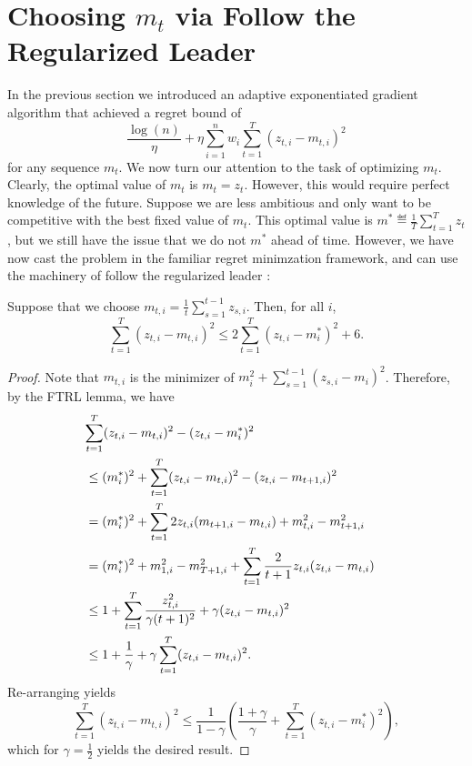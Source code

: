 \documentclass[paper_icml.tex]{subfiles}
\begin{document}
\section{Choosing $m_t$ via Follow the Regularized Leader} 
\label{sec:ftrl-aux}
In the previous section we introduced an adaptive exponentiated 
gradient algorithm that achieved a regret bound of 
\[ \frac{\log(n)}{\eta} + \eta \sum_{i=1}^n w_i \sum_{t=1}^T (z_{t,i} - m_{t,i})^2 \]
for any sequence $m_t$. We now turn our attention to the task of 
optimizing $m_t$. Clearly, the optimal value of $m_t$ is $m_t = z_t$. However, 
this would require perfect knowledge of the future. Suppose we are less ambitious 
and only want to be competitive with the best fixed value of $m_t$. This optimal value 
is $m^* \eqdef \frac{1}{T} \sum_{t=1}^T z_t$, but we still have the issue that 
we do not $m^*$ ahead of time. However, we have now cast the problem in the familiar 
regret minimzation framework, and can use the machinery of follow the regularized 
leader \cite{hazan2011ftrl}:
\begin{proposition}
\label{prop:ftrl-aux}
Suppose that we choose $m_{t,i} = \frac{1}{t} \sum_{s=1}^{t-1} z_{s,i}$. 
Then, for all $i$, 
\[ \sum_{t=1}^T (z_{t,i} - m_{t,i})^2 \leq 2\sum_{t=1}^T (z_{t,i} - m^*_i)^2 + 6. \]
\end{proposition}
\begin{proof}
Note that $m_{t,i}$ is the minimizer of $m_i^2 + \sum_{s=1}^{t-1} (z_{s,i} - m_i)^2$. 
Therefore, by the FTRL lemma, we have
\begin{align*}
\lefteqn{\sum_{t=1}^T (z_{t,i}-m_{t,i})^2 - (z_{t,i} - m^*_i)^2} \\
 &\leq (m^*_i)^2 + \sum_{t=1}^T (z_{t,i}-m_{t,i})^2 - (z_{t,i} - m_{t+1,i})^2 \\
 &= (m^*_i)^2 + \sum_{t=1}^T 2z_{t,i}(m_{t+1,i}-m_{t,i}) + m_{t,i}^2 - m_{t+1,i}^2 \\
 &= (m^*_i)^2 + m_{1,i}^2 - m_{T+1,i}^2 + \sum_{t=1}^T \frac{2}{t+1}z_{t,i}(z_{t,i} - m_{t,i}) \\
 &\leq 1 + \sum_{t=1}^T \frac{z_{t,i}^2}{\gamma (t+1)^2} + \gamma(z_{t,i} - m_{t,i})^2 \\
 &\leq 1 + \frac{1}{\gamma} + \gamma \sum_{t=1}^T (z_{t,i} - m_{t,i})^2.
\end{align*}
Re-arranging yields
\begin{equation*}
\sum_{t=1}^T (z_{t,i} - m_{t,i})^2 \leq \frac{1}{1-\gamma}\left(\frac{1+\gamma}{\gamma} + \sum_{t=1}^T (z_{t,i} - m_i^*)^2\right),
\end{equation*}
which for $\gamma = \frac{1}{2}$ yields the desired result.
\end{proof}
\end{document}
